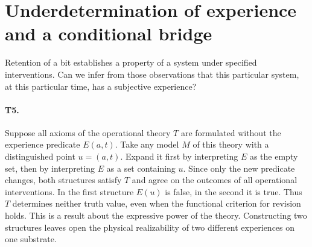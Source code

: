 \section{Underdetermination of experience and a conditional bridge}
\label{sec:boundary}
Retention of a bit establishes a property of a system under specified interventions. Can we infer from those observations that this particular system, at this particular time, has a subjective experience?

\paragraph{T5.} Suppose all axioms of the operational theory $T$ are formulated without the experience predicate $E(a,t)$. Take any model $M$ of this theory with a distinguished point $u=(a,t)$. Expand it first by interpreting $E$ as the empty set, then by interpreting $E$ as a set containing $u$. Since only the new predicate changes, both structures satisfy $T$ and agree on the outcomes of all operational interventions. In the first structure $E(u)$ is false, in the second it is true. Thus $T$ determines neither truth value, even when the functional criterion for revision holds. This is a result about the expressive power of the theory. Constructing two structures leaves open the physical realizability of two different experiences on one substrate.

